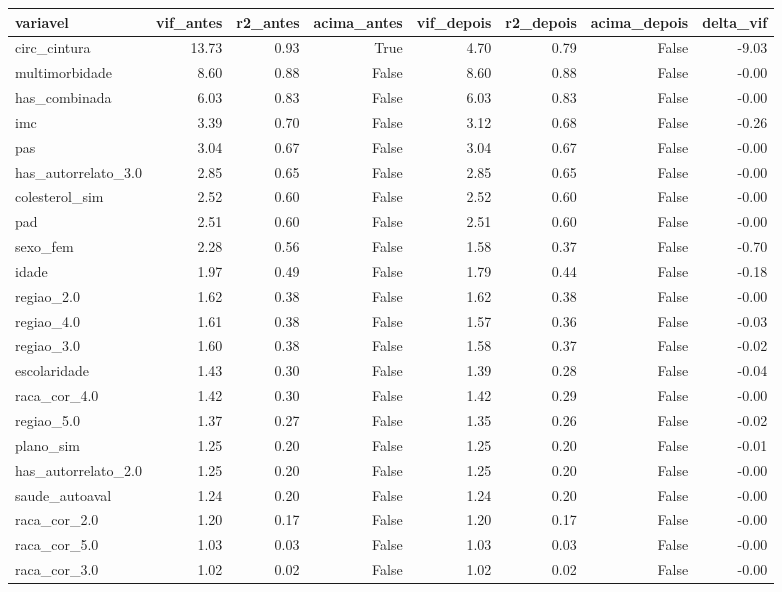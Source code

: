 \begin{tabular}{lrrrrrrr}
\toprule
variavel & vif_antes & r2_antes & acima_antes & vif_depois & r2_depois & acima_depois & delta_vif \\
\midrule
circ_cintura & 13.73 & 0.93 & True & 4.70 & 0.79 & False & -9.03 \\
multimorbidade & 8.60 & 0.88 & False & 8.60 & 0.88 & False & -0.00 \\
has_combinada & 6.03 & 0.83 & False & 6.03 & 0.83 & False & -0.00 \\
imc & 3.39 & 0.70 & False & 3.12 & 0.68 & False & -0.26 \\
pas & 3.04 & 0.67 & False & 3.04 & 0.67 & False & -0.00 \\
has_autorrelato_3.0 & 2.85 & 0.65 & False & 2.85 & 0.65 & False & -0.00 \\
colesterol_sim & 2.52 & 0.60 & False & 2.52 & 0.60 & False & -0.00 \\
pad & 2.51 & 0.60 & False & 2.51 & 0.60 & False & -0.00 \\
sexo_fem & 2.28 & 0.56 & False & 1.58 & 0.37 & False & -0.70 \\
idade & 1.97 & 0.49 & False & 1.79 & 0.44 & False & -0.18 \\
regiao_2.0 & 1.62 & 0.38 & False & 1.62 & 0.38 & False & -0.00 \\
regiao_4.0 & 1.61 & 0.38 & False & 1.57 & 0.36 & False & -0.03 \\
regiao_3.0 & 1.60 & 0.38 & False & 1.58 & 0.37 & False & -0.02 \\
escolaridade & 1.43 & 0.30 & False & 1.39 & 0.28 & False & -0.04 \\
raca_cor_4.0 & 1.42 & 0.30 & False & 1.42 & 0.29 & False & -0.00 \\
regiao_5.0 & 1.37 & 0.27 & False & 1.35 & 0.26 & False & -0.02 \\
plano_sim & 1.25 & 0.20 & False & 1.25 & 0.20 & False & -0.01 \\
has_autorrelato_2.0 & 1.25 & 0.20 & False & 1.25 & 0.20 & False & -0.00 \\
saude_autoaval & 1.24 & 0.20 & False & 1.24 & 0.20 & False & -0.00 \\
raca_cor_2.0 & 1.20 & 0.17 & False & 1.20 & 0.17 & False & -0.00 \\
raca_cor_5.0 & 1.03 & 0.03 & False & 1.03 & 0.03 & False & -0.00 \\
raca_cor_3.0 & 1.02 & 0.02 & False & 1.02 & 0.02 & False & -0.00 \\
\bottomrule
\end{tabular}
